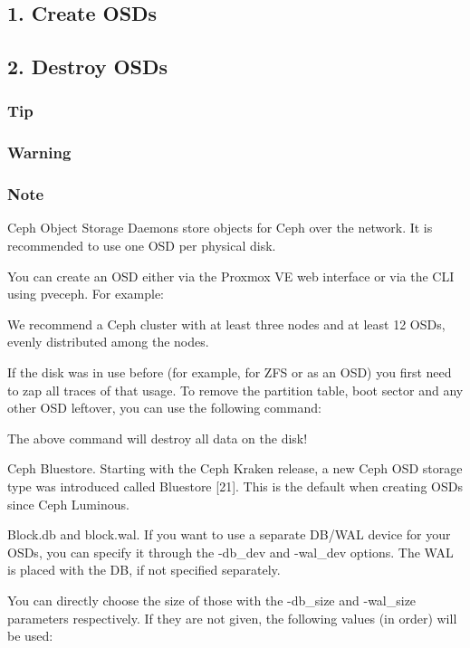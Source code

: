 \subsection{1. Create OSDs}

\subsection{2. Destroy OSDs}

\subsubsection{Tip}

\subsubsection{Warning}

\subsubsection{Note}

Ceph Object Storage Daemons store objects for Ceph over the network. It is recommended to use one OSD per physical disk.

You can create an OSD either via the Proxmox VE web interface or via the CLI using pveceph. For example:

We recommend a Ceph cluster with at least three nodes and at least 12 OSDs, evenly distributed among the nodes.

If the disk was in use before (for example, for ZFS or as an OSD) you first need to zap all traces of that usage. To remove the partition table, boot sector and any other OSD leftover, you can use the following command:

The above command will destroy all data on the disk!

Ceph Bluestore. Starting with the Ceph Kraken release, a new Ceph OSD storage type was introduced called Bluestore [21]. This is the default when creating OSDs since Ceph Luminous.

Block.db and block.wal. If you want to use a separate DB/WAL device for your OSDs, you can specify it through the -db_dev and -wal_dev options. The WAL is placed with the DB, if not specified separately.

You can directly choose the size of those with the -db_size and -wal_size parameters respectively. If they are not given, the following values (in order) will be used:

